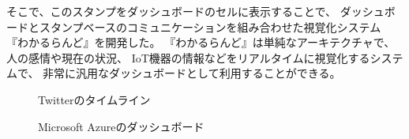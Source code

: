 そこで、このスタンプをダッシュボードのセルに表示することで、
ダッシュボードとスタンプベースのコミュニケーションを組み合わせた視覚化システム
『わかるらんど』を開発した。
『わかるらんど』は単純なアーキテクチャで、人の感情や現在の状況、
IoT機器の情報などをリアルタイムに視覚化するシステムで、
非常に汎用なダッシュボードとして利用することができる。

\begin{figure}[h]
\centering
{}
\caption{Twitterのタイムライン}
\label{twitter}
\end{figure}


\begin{figure}[h]
\centering
{}
\caption{Microsoft Azureのダッシュボード}
\label{asure}
\end{figure}
